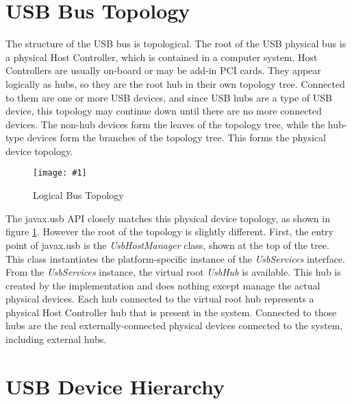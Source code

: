 \documentclass{article}
\newcommand{\myclass}[1]{\emph{#1}}
\newcommand{\myinterface}[1]{\emph{#1}}
\newcommand{\mysectionend}[0]{\vfill\pagebreak[1]}
\newcommand{\myfigure}[3]{\begin{figure}[htbp]\centering\texttt{[image: \#1]}\caption{#2}\label{#3}\end{figure}}
\begin{document}
\mysectionend


%

\section{USB Bus Topology}

The structure of the USB bus is topological.  The root
of the USB physical bus is a physical Host Controller, which is contained
in a computer system.  Host Controllers are usually on-board or may be
add-in PCI cards.  They appear logically as hubs, so they are the root hub
in their own topology tree.  Connected to them are one or more USB devices,
and since USB hubs are a type of USB device, this topology may continue
down until there are no more connected devices.  The non-hub devices form
the leaves of the topology tree, while the hub-type devices form the branches
of the topology tree.  This forms the physical device topology.

\myfigure{figs/logical_bus_topology}{Logical Bus Topology}{bus_topology}

The javax.usb API closely matches this physical device topology, as shown in
figure \ref{bus_topology}.  However the root of the topology is slightly different.
First, the entry point of javax.usb is the \myclass{UsbHostManager} class, shown at the
top of the tree.  This class instantiates the platform-specific instance of
the \myinterface{UsbServices} interface.  From the \myinterface{UsbServices} instance, the virtual root
\myinterface{UsbHub} is available.  This hub is created by the implementation and does
nothing except manage the actual physical devices.  Each hub connected to
the virtual root hub represents a physical Host Controller hub that is
present in the system.  Connected to those hubs are the real externally-connected
physical devices connected to the system, including external hubs.

\mysectionend


\section{USB Device Hierarchy}
\end{document}
